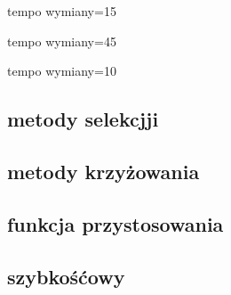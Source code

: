 \documentclass{article}
\begin{document}










tempo wymiany=15





tempo wymiany=45





tempo wymiany=10





\subsection{metody selekcjji}







\subsection{metody krzyżowania}




\subsection{funkcja przystosowania}






\subsection{szybkośćowy}


\end{document}
